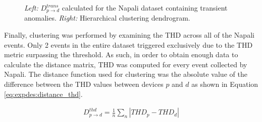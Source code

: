 \begin{figure}[ht!]
\begin{subfigure}{0.45\textwidth}
        \caption{}
        \label{fig:expdes:sub:cluster_trans:de}
    \end{subfigure}
    \caption{
    \textit{Left:} $D_{p \rightarrow d}^{trans}$ calculated for the Napali dataset containing transient anomalies.
    \textit{Right:} Hierarchical clustering dendrogram.
    }
    \label{fig:expdes:sub:cluster_trans}
\end{figure}

Finally, clustering was performed by examining the THD across all of the Napali events.
Only 2 events in the entire dataset triggered exclusively due to the THD metric surpassing the threshold.
As such, in order to obtain enough data to calculate the distance matrix, THD was computed for every event collected by Napali.
The distance function used for clustering was the absolute value of the difference between the THD values between devices $p$ and $d$ as shown in Equation \ref{eq:expdes:distance_thd}.

\begin{equation} \label{eq:expdes:distance_thd}
\begin{aligned}
    D_{p \rightarrow d}^{thd} = \frac{1}{n}\sum_{n}|THD_{p} - THD_{d}|
\end{aligned}
\end{equation}

